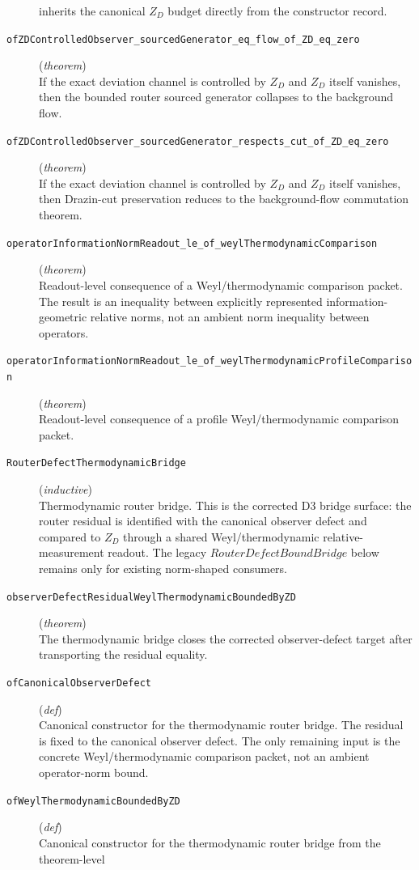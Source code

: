 \documentclass[11pt,a4paper]{article}
\begin{document}
\begin{description}
inherits the canonical $Z_D$ budget directly from the constructor record.
  \item[\texttt{ofZDControlledObserver\_sourcedGenerator\_eq\_flow\_of\_ZD\_eq\_zero}] (\textit{theorem}) \\ If the exact deviation channel is controlled by $Z_D$ and $Z_D$ itself vanishes, 
then the bounded router sourced generator collapses to the background flow.
  \item[\texttt{ofZDControlledObserver\_sourcedGenerator\_respects\_cut\_of\_ZD\_eq\_zero}] (\textit{theorem}) \\ If the exact deviation channel is controlled by $Z_D$ and $Z_D$ itself vanishes, 
then Drazin-cut preservation reduces to the background-flow commutation theorem.
  \item[\texttt{operatorInformationNormReadout\_le\_of\_weylThermodynamicComparison}] (\textit{theorem}) \\ Readout-level consequence of a Weyl/thermodynamic comparison packet. 
The result is an inequality between explicitly represented information-geometric 
relative norms, not an ambient norm inequality between operators.
  \item[\texttt{operatorInformationNormReadout\_le\_of\_weylThermodynamicProfileComparison}] (\textit{theorem}) \\ Readout-level consequence of a profile Weyl/thermodynamic comparison packet.
  \item[\texttt{RouterDefectThermodynamicBridge}] (\textit{inductive}) \\ Thermodynamic router bridge. 
This is the corrected D3 bridge surface: the router residual is identified with 
the canonical observer defect and compared to $Z_D$ through a shared 
Weyl/thermodynamic relative-measurement readout. The legacy 
$RouterDefectBoundBridge$ below remains only for existing norm-shaped consumers.
  \item[\texttt{observerDefectResidualWeylThermodynamicBoundedByZD}] (\textit{theorem}) \\ The thermodynamic bridge closes the corrected observer-defect target after 
transporting the residual equality.
  \item[\texttt{ofCanonicalObserverDefect}] (\textit{def}) \\ Canonical constructor for the thermodynamic router bridge. 
The residual is fixed to the canonical observer defect. The only remaining 
input is the concrete Weyl/thermodynamic comparison packet, not an ambient 
operator-norm bound.
  \item[\texttt{ofWeylThermodynamicBoundedByZD}] (\textit{def}) \\ Canonical constructor for the thermodynamic router bridge from the theorem-level 

\end{description}
\end{document}
